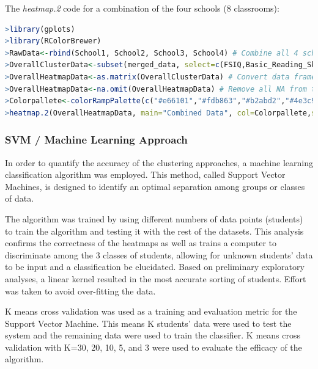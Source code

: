 \documentclass[twoside]{article}
\begin{document}
The \textit{heatmap.2} code for a combination of the four schools (8 classrooms):
\begin{lstlisting}[language=R]
>library(gplots)
>library(RColorBrewer)
>RawData<-rbind(School1, School2, School3, School4) # Combine all 4 school's data
>OverallClusterData<-subset(merged_data, select=c(FSIQ,Basic_Reading_Skills,Reading_Comp,Math_Calc,Math_Reasoning,Written_Lang,Adaptive,SocioEmotional, CBM_Math, CBM_Reading)) #Subset data
>OverallHeatmapData<-as.matrix(OverallClusterData) # Convert data frame to a matrix. Heatmap.2 requires a data matrix
>OverallHeatmapData<-na.omit(OverallHeatmapData) # Remove all NA from the data
>Colorpallete<-colorRampPalette(c("#e66101","#fdb863","#b2abd2","#4e3c99"))(n=256) # Selection of a color-blind appropriate color scheme using RColorBrewer
>heatmap.2(OverallHeatmapData, main="Combined Data", col=Colorpallete,scale="none",rowsep=1:200, colsep=1:10, sepcol="white",sepwidth=c(.015,.025),trace="none",labRow=merged_data$Name,margins=c(10,10),cexRow=.75,cexCol=1,keysize=2,lhei=c(3,10)) # Application of Ward's Unsupervised Hierarchal Clustering method
\end{lstlisting}

\subsubsection{SVM / Machine Learning Approach}

In order to quantify the accuracy of the clustering approaches, a machine learning classification algorithm was employed. This method, called Support Vector Machines, is designed to identify an optimal separation among groups or classes of data.

The algorithm was trained by using different numbers of data points (students) to train the algorithm and testing it with the rest of the datasets. This analysis confirms the correctness of the heatmaps as well as trains a computer to discriminate among the 3 classes of students, allowing for unknown students' data to be input and a classification be elucidated. Based on preliminary exploratory analyses, a linear kernel resulted in the most accurate sorting of students. Effort was taken to avoid over-fitting the data.

K means cross validation was used as a training and evaluation metric for the Support Vector Machine. This means K students' data were used to test the system and the remaining data were used to train the classifier. K means cross validation with K=30, 20, 10, 5, and 3 were used to evaluate the efficacy of the algorithm.
\end{document}
